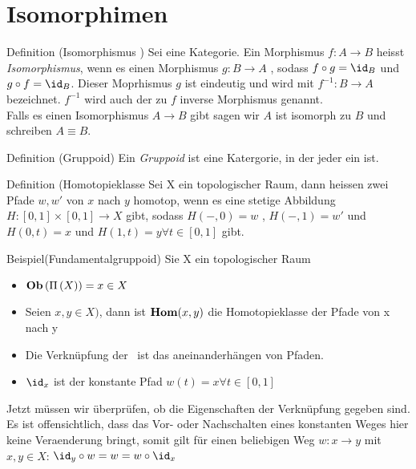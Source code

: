 \documentclass{article}
\begin{document}
	\section{Isomorphimen}
	
		Definition (Isomorphismus ) \cite[Definition 2.3.1]{Bra}
		Sei \CatC eine Kategorie. Ein Morphismus \( f: A \to B  \) heisst  \emph{Isomorphismus}, wenn es einen Morphismus \( g: B \to A \) , sodass \( f \circ g  = \id_B \) und \( g \circ f = \id_B \). 
		Dieser Moprhismus \( g \) ist eindeutig und wird mit \( f^{-1} :B \to A \) bezeichnet.
		\(f^{-1} \) wird auch der zu \( f \)  inverse Morphismus genannt.\\
			
		Falls es einen Isomorphismus \(A \to B \) gibt sagen wir \( A \) ist isomorph zu \( B \) und schreiben \( A \equiv B \).
		
		 Definition (Gruppoid) \cite[Beispiel 2.2.34]{Bra}
		 Ein \emph{Gruppoid} ist eine Katergorie, in der jeder \Mor ein \Iso ist.
		 
		 Definition (Homotopieklasse \cite[Aufgabe 2.24]{Bra}
		 Sei X ein topologischer Raum, dann heissen zwei Pfade \( w,w'  \) von \(x \) nach \( y \) homotop, wenn es eine stetige Abbildung \( H : [0,1] \times [0,1 ] \to X \) gibt, sodass \( H(-,0) = w \) , \( H( -,1) =w' \) und \( H(0,t) =x \) und \(H(1,t) = y \forall t \in [0,1] \) gibt.
		 
		 
		 Beispiel(Fundamentalgruppoid)\cite[ Aufgabe 2.24 ]{Bra}
		 Sie X ein topologischer Raum
		\begin{itemize}
			\item \( \mathbf{Ob}  \left( \Pi \left( X \right) \right) = x \in X \)
			 \item Seien \( x ,y \in X ) \), dann ist \(  \mathbf{Hom } (x,y) \) die Homotopieklasse der Pfade von x nach y
			 \item Die Verkn\"upfung der \Hom \ ist das aneinanderh\"angen von Pfaden.
			 \item \(  \id_x \) ist der konstante Pfad \( w(t)=x \forall t \in [0,1] \)
		\end{itemize}
		Jetzt m\"ussen wir \"uberpr\"ufen, ob die Eigenschaften der Verkn\"upfung gegeben sind.
		Es ist offensichtlich, dass das Vor- oder Nachschalten eines konstanten Weges hier keine Veraenderung bringt, somit gilt f\"ur einen beliebigen Weg 
		\(w:x \to y \) mit \( x,y \in X\):
		\( \id_y \circ w = w = w \circ \id_x \)
		 

 
\end{document}
